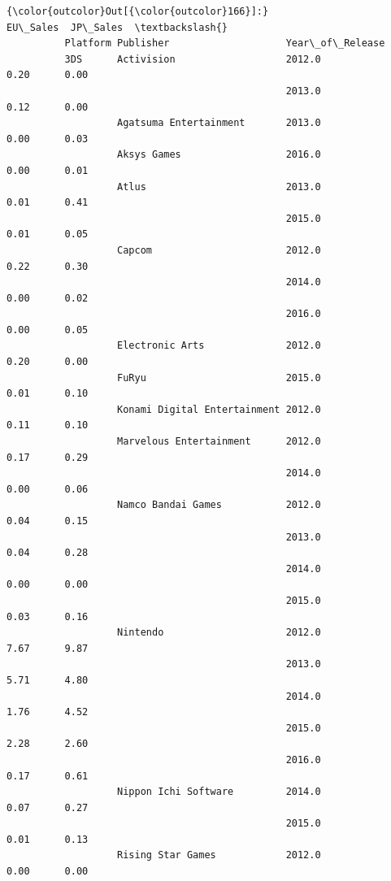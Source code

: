 \documentclass[11pt]{article}
\begin{document}
\begin{Verbatim}[commandchars=\\\{\}]
{\color{outcolor}Out[{\color{outcolor}166}]:}                                                        EU\_Sales  JP\_Sales  \textbackslash{}
          Platform Publisher                    Year\_of\_Release                       
          3DS      Activision                   2012.0               0.20      0.00   
                                                2013.0               0.12      0.00   
                   Agatsuma Entertainment       2013.0               0.00      0.03   
                   Aksys Games                  2016.0               0.00      0.01   
                   Atlus                        2013.0               0.01      0.41   
                                                2015.0               0.01      0.05   
                   Capcom                       2012.0               0.22      0.30   
                                                2014.0               0.00      0.02   
                                                2016.0               0.00      0.05   
                   Electronic Arts              2012.0               0.20      0.00   
                   FuRyu                        2015.0               0.01      0.10   
                   Konami Digital Entertainment 2012.0               0.11      0.10   
                   Marvelous Entertainment      2012.0               0.17      0.29   
                                                2014.0               0.00      0.06   
                   Namco Bandai Games           2012.0               0.04      0.15   
                                                2013.0               0.04      0.28   
                                                2014.0               0.00      0.00   
                                                2015.0               0.03      0.16   
                   Nintendo                     2012.0               7.67      9.87   
                                                2013.0               5.71      4.80   
                                                2014.0               1.76      4.52   
                                                2015.0               2.28      2.60   
                                                2016.0               0.17      0.61   
                   Nippon Ichi Software         2014.0               0.07      0.27   
                                                2015.0               0.01      0.13   
                   Rising Star Games            2012.0               0.00      0.00   

\end{Verbatim}
\end{document}
